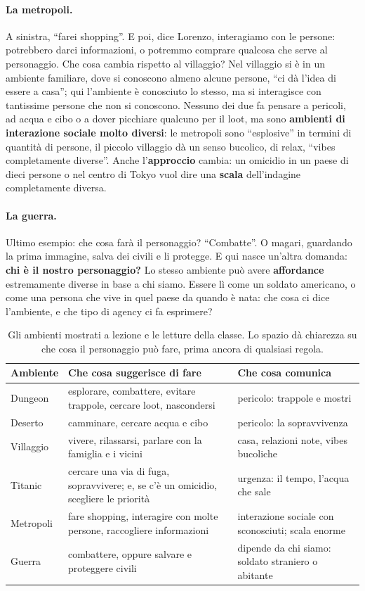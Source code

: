 \paragraph{La metropoli.} A sinistra, ``farei shopping''. E poi, dice Lorenzo,
interagiamo con le persone: potrebbero darci informazioni, o potremmo comprare
qualcosa che serve al personaggio. Che cosa cambia rispetto al villaggio? Nel
villaggio si è in un ambiente familiare, dove si conoscono almeno alcune persone,
``ci dà l'idea di essere a casa''; qui l'ambiente è conosciuto lo stesso, ma si
interagisce con tantissime persone che non si conoscono. Nessuno dei due fa pensare
a pericoli, ad acqua e cibo o a dover picchiare qualcuno per il loot, ma sono
\textbf{ambienti di interazione sociale molto diversi}: le metropoli sono
``esplosive'' in termini di quantità di persone, il piccolo villaggio dà un senso
bucolico, di relax, ``vibes completamente diverse''. Anche l'\textbf{approccio}
cambia: un omicidio in un paese di dieci persone o nel centro di Tokyo vuol dire una
\textbf{scala} dell'indagine completamente diversa.

\paragraph{La guerra.} Ultimo esempio: che cosa farà il personaggio? ``Combatte''.
O magari, guardando la prima immagine, salva dei civili e li protegge. E qui nasce
un'altra domanda: \textbf{chi è il nostro personaggio?} Lo stesso ambiente può avere
\textbf{affordance} estremamente diverse in base a chi siamo. Essere lì come un
soldato americano, o come una persona che vive in quel paese da quando è nata: che
cosa ci dice l'ambiente, e che tipo di agency ci fa esprimere?

\begin{table}[htbp]
\centering
\small
\begin{tabular}{@{}p{2.3cm}p{5.4cm}p{5.4cm}@{}}
\toprule
\textbf{Ambiente} & \textbf{Che cosa suggerisce di fare} & \textbf{Che cosa
comunica} \\
\midrule
Dungeon & esplorare, combattere, evitare trappole, cercare loot, nascondersi &
pericolo: trappole e mostri \\
Deserto & camminare, cercare acqua e cibo & pericolo: la sopravvivenza \\
Villaggio & vivere, rilassarsi, parlare con la famiglia e i vicini & casa,
relazioni note, vibes bucoliche \\
Titanic & cercare una via di fuga, sopravvivere; e, se c'è un omicidio, scegliere
le priorità & urgenza: il tempo, l'acqua che sale \\
Metropoli & fare shopping, interagire con molte persone, raccogliere informazioni
& interazione sociale con sconosciuti; scala enorme \\
Guerra & combattere, oppure salvare e proteggere civili & dipende da chi siamo:
soldato straniero o abitante \\
\bottomrule
\end{tabular}
\caption{Gli ambienti mostrati a lezione e le letture della classe. Lo spazio dà
chiarezza su che cosa il personaggio può fare, prima ancora di qualsiasi regola.}
\label{a4:tab:spazi}
\end{table}

